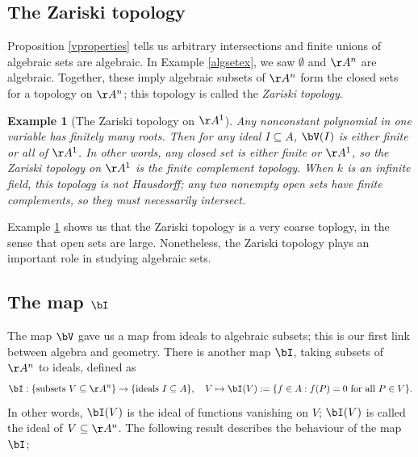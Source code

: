 \documentclass[12pt]{amsart}
\theoremstyle{plain}
\newtheorem{example}[theorem]{Example}
\begin{document}
\subsection{The Zariski topology}
Proposition \ref{vproperties} tells us arbitrary intersections and finite unions of algebraic sets are algebraic.
In Example \ref{algsetex}, we saw $\emptyset$ and $\AA^n$ are algebraic.
Together, these imply algebraic subsets of $\AA^n$ form the closed sets for a topology on $\AA^n$; this topology is called the \emph{Zariski topology}.

\begin{example}[The Zariski topology on $\AA^1$]\label{zariskia1}
Any nonconstant polynomial in one variable has finitely many roots.
Then for any ideal $I \subseteq A$, $\bV(I)$ is either finite or all of $\AA^1$.
In other words, any closed set is either finite or $\AA^1$, so the Zariski topology on $\AA^1$ is the finite complement topology.
When $k$ is an infinite field, this topology is not Hausdorff; any two nonempty open sets have finite complements, so they must necessarily intersect.
\end{example}

Example \ref{zariskia1} shows us that the Zariski topology is a very coarse toplogy, in the sense that open sets are large.
Nonetheless, the Zariski topology plays an important role in studying algebraic sets.

\subsection{The map $\bI$}
The map $\bV$ gave us a map from ideals to algebraic subsets; this is our first link between algebra and geometry.
There is another map $\bI$, taking subsets of $\AA^n$ to ideals, defined as
$$\bI: \{\text{subsets } V \subseteq \AA^n\} \to \{\text{ideals } I \subseteq A\}, \quad V\mapsto \bI(V) := \{f \in A : f(P) = 0 \text{ for all } P \in V\}.$$
In other words, $\bI(V)$ is the ideal of functions vanishing on $V$; $\bI(V)$ is called the ideal of $V \subseteq \AA^n$.
The following result describes the behaviour of the map $\bI$;
\end{document}
